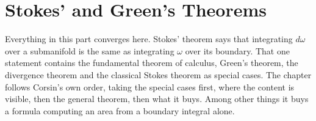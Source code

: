 \chapter{Stokes' and Green's Theorems}
\label{ch:stokes}

Everything in this part converges here. Stokes' theorem says that integrating $d\omega$ over a
submanifold is the same as integrating $\omega$ over its boundary. That one statement contains
the fundamental theorem of calculus, Green's theorem, the divergence theorem and the classical
Stokes theorem as special cases. The chapter follows Corsin's own order, taking the special
cases first, where the content is visible, then the general theorem, then what it buys. Among
other things it buys a formula computing an area from a boundary integral alone.







